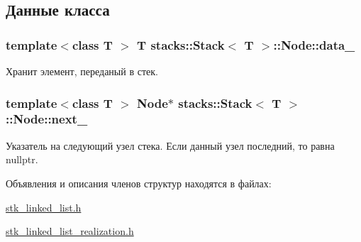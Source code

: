 \subsection{Данные класса}
\hypertarget{structstacks_1_1_stack_1_1_node_afbadaa4f786b45d6cd157070caf8ab83}{}
\subsubsection[{data\+\_\+}]{\setlength{\rightskip}{0pt plus 5cm}template$<$class T $>$ T {\bf stacks\+::\+Stack}$<$ T $>$\+::Node\+::data\+\_\+}\label{structstacks_1_1_stack_1_1_node_afbadaa4f786b45d6cd157070caf8ab83}


Хранит элемент, переданый в стек. 

\hypertarget{structstacks_1_1_stack_1_1_node_a8274602a782c7533e4f1c7936026913d}{}
\subsubsection[{next\+\_\+}]{\setlength{\rightskip}{0pt plus 5cm}template$<$class T $>$ {\bf Node}$\ast$ {\bf stacks\+::\+Stack}$<$ T $>$\+::Node\+::next\+\_\+}\label{structstacks_1_1_stack_1_1_node_a8274602a782c7533e4f1c7936026913d}


Указатель на следующий узел стека. Если данный узел последний, то равна nullptr. 



Объявления и описания членов структур находятся в файлах\+:\begin{DoxyCompactItemize}
\item 
\hyperlink{stk__linked__list_8h}{stk\+\_\+linked\+\_\+list.\+h}\item 
\hyperlink{stk__linked__list__realization_8h}{stk\+\_\+linked\+\_\+list\+\_\+realization.\+h}\end{DoxyCompactItemize}

